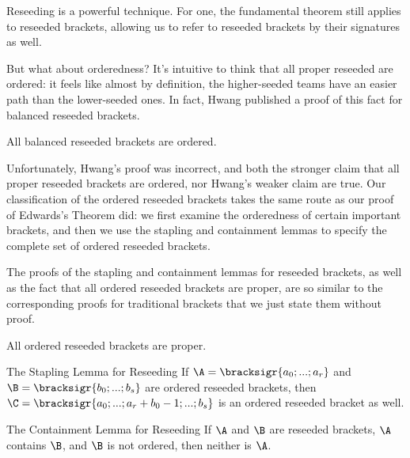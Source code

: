 {    Reseeding is a powerful technique. For one, the fundamental theorem still applies to reseeded brackets, allowing us to refer to reseeded brackets by their signatures as well.


    But what about orderedness? It's intuitive to think that all proper reseeded are ordered: it feels like almost by definition, the higher-seeded teams have an easier path than the lower-seeded ones. In fact, Hwang \cite{reseeding} published a proof of this fact for balanced reseeded brackets.

    \begin{conj}{}{}
        All balanced reseeded brackets are ordered.
    \end{conj}

    Unfortunately, Hwang's proof was incorrect, and both the stronger claim that all proper reseeded brackets are ordered, nor Hwang's weaker claim are true. Our classification of the ordered reseeded brackets takes the same route as our proof of Edwards's Theorem did: we first examine the orderedness of certain important brackets, and then we use the stapling and containment lemmas to specify the complete set of ordered reseeded brackets.

    The proofs of the stapling and containment lemmas for reseeded brackets, as well as the fact that all ordered reseeded brackets are proper, are so similar to the corresponding proofs for traditional brackets that we just state them without proof.

    \begin{theorem}{}{}
        All ordered reseeded brackets are proper.
    \end{theorem}
    \begin{lemma}{The Stapling Lemma for Reseeding}{}
        If $\A = \bracksigr{a_0; ...; a_r}$ and $\B = \bracksigr{b_0; ...; b_s}$ are ordered reseeded brackets, then $\C = \bracksigr{a_0; ...; a_r + b_0 - 1; ...; b_s}$ is an ordered reseeded bracket as well.
    \end{lemma}
    \begin{lemma}{The Containment Lemma for Reseeding}{}
        If $\A$ and $\B$ are reseeded brackets, $\A$ contains $\B$, and $\B$ is not ordered, then neither is $\A$.
    \end{lemma}

}
